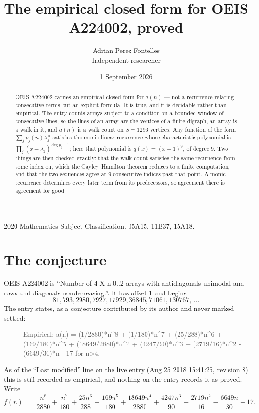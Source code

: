 \documentclass[11pt,a4paper]{article}
\title{The empirical closed form for OEIS A224002, proved}
\author{Adrian Perez Fontelles\\ \small Independent researcher}
\date{1 September 2026}
\theoremstyle{plain}
\theoremstyle{definition}
\begin{document}
\maketitle

\begin{abstract}
OEIS A224002 carries an empirical closed form for $a(n)$ --- not a recurrence relating
consecutive terms but an explicit formula. It is true, and it is decidable rather than
empirical. The entry counts arrays subject to a condition on a bounded window of consecutive lines, so the lines of an array are the
vertices of a finite digraph, an array is a walk in it, and $a(n)$ is a walk count on
$S=1296$ vertices. Any function of the form $\sum_j p_j(n)\lambda_j^{\,n}$ satisfies the
monic linear recurrence whose characteristic polynomial is
$\prod_j(x-\lambda_j)^{\deg p_j+1}$; here that polynomial is $q(x)=(x-1)^{9}$, of degree
$9$. Two things are then checked exactly: that the walk count satisfies the same
recurrence from some index on, which the Cayley--Hamilton theorem reduces to a finite
computation, and that the two sequences agree at $9$ consecutive indices past that
point. A monic recurrence determines every later term from its predecessors, so agreement
there is agreement for good.
\end{abstract}

\noindent\small 2020 Mathematics Subject Classification. 05A15, 11B37, 15A18.\normalsize

\section{The conjecture}

OEIS A224002 is ``Number of 4 X n 0..2 arrays with antidiagonals unimodal and rows and diagonals nondecreasing.''. It has offset $1$ and begins
\[
81, 793, 2980, 7927, 17929, 36845, 71061, 130767,\ \dots
\]
The entry states, as a conjecture contributed by its author and never marked settled:
\begin{quote}
Empirical: a(n) = (1/2880)*n\^{}8 + (1/180)*n\^{}7 + (25/288)*n\^{}6 + (169/180)*n\^{}5 + (18649/2880)*n\^{}4 + (4247/90)*n\^{}3 + (2719/16)*n\^{}2 - (6649/30)*n - 17 for n>4.
\end{quote}
As of the ``Last modified'' line on the live entry (Aug 25 2018 15:41:25, revision 8) this is still
recorded as empirical, and nothing on the entry records it as proved. Write
\[
f(n)\;=\;\frac{n^{8}}{2880} + \frac{n^{7}}{180} + \frac{25 n^{6}}{288} + \frac{169 n^{5}}{180} + \frac{18649 n^{4}}{2880} + \frac{4247 n^{3}}{90} + \frac{2719 n^{2}}{16} - \frac{6649 n}{30} - 17.
\]
\end{document}
